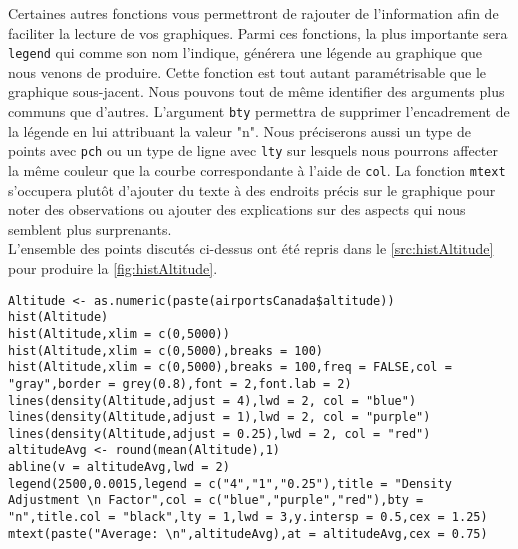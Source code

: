 Certaines autres fonctions vous permettront de rajouter de l'information afin de faciliter la lecture de vos graphiques. Parmi ces fonctions, la plus importante sera \texttt{legend} qui comme son nom l'indique, générera une légende au graphique que nous venons de produire. Cette fonction est tout autant paramétrisable que le graphique sous-jacent. Nous pouvons tout de même identifier des arguments plus communs que d'autres. L'argument \texttt{bty} permettra de supprimer l'encadrement de la légende en lui attribuant la valeur "n". Nous préciserons aussi un type de points avec \texttt{pch} ou un type de ligne avec \texttt{lty} sur lesquels nous pourrons affecter la même couleur que la courbe correspondante à l'aide de \texttt{col}. La fonction \texttt{mtext} s'occupera plutôt d'ajouter du texte à des endroits précis sur le graphique pour noter des observations ou ajouter des explications sur des aspects qui nous semblent plus surprenants. \\

L'ensemble des points discutés ci-dessus ont été repris dans le \autoref{src:histAltitude} pour produire la \autoref{fig:histAltitude}. \\

\begin{lstlisting}[caption = {\texttt{hist}, \texttt{density}, \texttt{lines}, \texttt{abline}, \texttt{legend} et \texttt{mtext}},label=src:histAltitude]
Altitude <- as.numeric(paste(airportsCanada$altitude))
hist(Altitude)
hist(Altitude,xlim = c(0,5000))
hist(Altitude,xlim = c(0,5000),breaks = 100)
hist(Altitude,xlim = c(0,5000),breaks = 100,freq = FALSE,col = "gray",border = grey(0.8),font = 2,font.lab = 2)
lines(density(Altitude,adjust = 4),lwd = 2, col = "blue")
lines(density(Altitude,adjust = 1),lwd = 2, col = "purple")
lines(density(Altitude,adjust = 0.25),lwd = 2, col = "red")
altitudeAvg <- round(mean(Altitude),1)
abline(v = altitudeAvg,lwd = 2)
legend(2500,0.0015,legend = c("4","1","0.25"),title = "Density Adjustment \n Factor",col = c("blue","purple","red"),bty = "n",title.col = "black",lty = 1,lwd = 3,y.intersp = 0.5,cex = 1.25)
mtext(paste("Average: \n",altitudeAvg),at = altitudeAvg,cex = 0.75)
\end{lstlisting}


